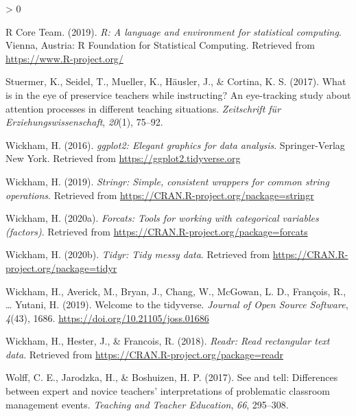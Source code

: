 \documentclass[
  english,
  man,floatsintext]{apa6}
\newlength{\cslhangindent}
\newenvironment{CSLReferences}[2] %
 {%
  \setlength{\parindent}{0pt}
  \ifodd #1 \everypar{\setlength{\hangindent}{\cslhangindent}}\ignorespaces\fi
  \ifnum #2 > 0
  \setlength{\parskip}{#2\baselineskip}
  \fi
 }%
 {}
\begin{document}
\begin{CSLReferences}{1}{0}
\leavevmode\hypertarget{ref-R-base}{}%
R Core Team. (2019). \emph{R: A language and environment for statistical computing}. Vienna, Austria: R Foundation for Statistical Computing. Retrieved from \url{https://www.R-project.org/}

\leavevmode\hypertarget{ref-stuermer2017eye}{}%
Stuermer, K., Seidel, T., Mueller, K., Häusler, J., \& Cortina, K. S. (2017). What is in the eye of preservice teachers while instructing? An eye-tracking study about attention processes in different teaching situations. \emph{Zeitschrift f{ü}r Erziehungswissenschaft}, \emph{20}(1), 75--92.

\leavevmode\hypertarget{ref-R-ggplot2}{}%
Wickham, H. (2016). \emph{ggplot2: Elegant graphics for data analysis}. Springer-Verlag New York. Retrieved from \url{https://ggplot2.tidyverse.org}

\leavevmode\hypertarget{ref-R-stringr}{}%
Wickham, H. (2019). \emph{Stringr: Simple, consistent wrappers for common string operations}. Retrieved from \url{https://CRAN.R-project.org/package=stringr}

\leavevmode\hypertarget{ref-R-forcats}{}%
Wickham, H. (2020a). \emph{Forcats: Tools for working with categorical variables (factors)}. Retrieved from \url{https://CRAN.R-project.org/package=forcats}

\leavevmode\hypertarget{ref-R-tidyr}{}%
Wickham, H. (2020b). \emph{Tidyr: Tidy messy data}. Retrieved from \url{https://CRAN.R-project.org/package=tidyr}

\leavevmode\hypertarget{ref-R-tidyverse}{}%
Wickham, H., Averick, M., Bryan, J., Chang, W., McGowan, L. D., François, R., \ldots{} Yutani, H. (2019). Welcome to the {tidyverse}. \emph{Journal of Open Source Software}, \emph{4}(43), 1686. \url{https://doi.org/10.21105/joss.01686}

\leavevmode\hypertarget{ref-R-readr}{}%
Wickham, H., Hester, J., \& Francois, R. (2018). \emph{Readr: Read rectangular text data}. Retrieved from \url{https://CRAN.R-project.org/package=readr}

\leavevmode\hypertarget{ref-wolff2017see}{}%
Wolff, C. E., Jarodzka, H., \& Boshuizen, H. P. (2017). See and tell: Differences between expert and novice teachers' interpretations of problematic classroom management events. \emph{Teaching and Teacher Education}, \emph{66}, 295--308.

\end{CSLReferences}

\endgroup
\end{document}
